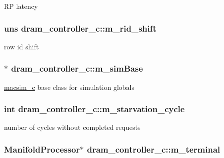 \label{classdram__controller__c_aa61d120e34408419e0962dafb2681402}
RP latency \hypertarget{classdram__controller__c_a47129cd3d0467da1d6e53c928226858e}{
\subsubsection[{m\_\-rid\_\-shift}]{\setlength{\rightskip}{0pt plus 5cm}uns {\bf dram\_\-controller\_\-c::m\_\-rid\_\-shift}}}
\label{classdram__controller__c_a47129cd3d0467da1d6e53c928226858e}
row id shift \hypertarget{classdram__controller__c_ae96442e89de273175e8d2ee453a2c688}{
\subsubsection[{m\_\-simBase}]{$\ast$ {\bf dram\_\-controller\_\-c::m\_\-simBase}}}
\label{classdram__controller__c_ae96442e89de273175e8d2ee453a2c688}
\hyperlink{classmacsim__c}{macsim\_\-c} base class for simulation globals \hypertarget{classdram__controller__c_a7fc3aa259f15cd2f9cc87753d458f166}{
\subsubsection[{m\_\-starvation\_\-cycle}]{\setlength{\rightskip}{0pt plus 5cm}int {\bf dram\_\-controller\_\-c::m\_\-starvation\_\-cycle}}}
\label{classdram__controller__c_a7fc3aa259f15cd2f9cc87753d458f166}
number of cycles without completed requests \hypertarget{classdram__controller__c_a572404de89967a3b7294080ff7390110}{
\subsubsection[{m\_\-terminal}]{\setlength{\rightskip}{0pt plus 5cm}ManifoldProcessor$\ast$ {\bf dram\_\-controller\_\-c::m\_\-terminal}}}
